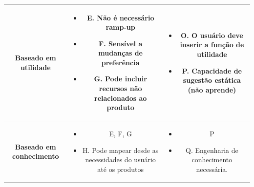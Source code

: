 \begin{table}[]
\begin{tabular}{|c|c|c|}
	\textbf{Baseado em utilidade}  & \begin{minipage} [t] {0.3\textwidth} \begin{itemize} \item  E. Não é necessário ramp-up \item F. Sensível a mudanças de preferência \item{G. Pode incluir recursos não relacionados ao produto}\end{itemize} \end{minipage} & \begin{minipage} [t] {0.3\textwidth} \begin{itemize} \item O. O usuário deve inserir a função de utilidade \item P. Capacidade de sugestão estática (não aprende)\end{itemize} \end{minipage} \\ \hline
	\textbf{Baseado em conhecimento}  & \begin{minipage} [t] {0.3\textwidth} \begin{itemize} \item E, F, G \item H. Pode mapear desde as necessidades do usuário até os produtos\end{itemize} \end{minipage} & \begin{minipage} [t] {0.3\textwidth} \begin{itemize} \item P \item Q. Engenharia de conhecimento necessária.\end{itemize} \end{minipage} \\ \hline
	\end{tabular}
\end{table}